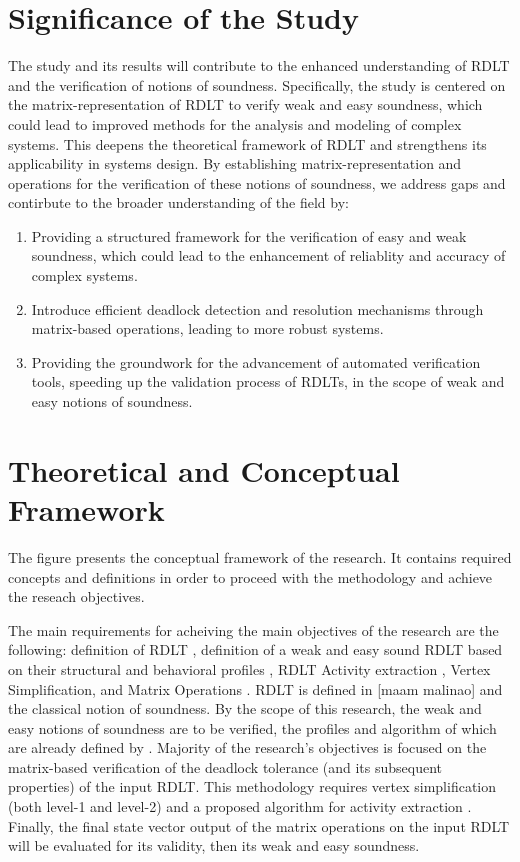 \section{Significance of the Study}
\indent The study and its results will contribute to the enhanced understanding of RDLT and the verification of notions of soundness. Specifically, the study is centered on the matrix-representation of RDLT to verify weak and easy soundness, which could lead to improved methods for the analysis and modeling of complex systems. This deepens the theoretical framework of RDLT and strengthens its applicability in systems design. By establishing matrix-representation and operations for the verification of these notions of soundness, we address gaps and contirbute to the broader understanding of the field by:
\begin{enumerate}
    \item Providing a structured framework for the verification of easy and weak soundness, which could lead to the enhancement of reliablity and accuracy of complex systems.
    \item Introduce efficient deadlock detection and resolution mechanisms through matrix-based operations, leading to more robust systems.
    \item Providing the groundwork for the advancement of automated verification tools, speeding up the validation process of RDLTs, in the scope of weak and easy notions of soundness.
\end{enumerate}

\section{Theoretical and Conceptual Framework}
The figure presents the conceptual framework of the research. It contains required concepts and definitions in order to proceed with the methodology and achieve the reseach objectives. 

The main requirements for acheiving the main objectives of the research are the following: definition of RDLT \cite{Malinao2017}, definition of a weak and easy sound RDLT based on their structural and behavioral profiles \cite{Ramirez2024}, RDLT Activity extraction \cite{Malinao2017} \cite{Asoy2024}, Vertex Simplification, and Matrix Operations \cite{KarenRoben2018}. RDLT is defined in [maam malinao] and the classical notion of soundness. By the scope of this research, the weak and easy notions of soundness are to be verified, the profiles and algorithm of which are already defined by \cite{Ramirez2024}. Majority of the research's objectives is focused on the matrix-based verification of the deadlock tolerance (and its subsequent properties) of the input RDLT. This methodology requires vertex simplification \cite{Malinao2017} (both level-1 and level-2) and a proposed algorithm for activity extraction \cite{Malinao2017}. Finally, the final state vector output of the matrix operations on the input RDLT will be evaluated for its validity, then its weak and easy soundness.

